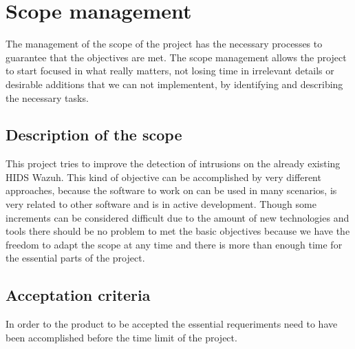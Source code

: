 \section{Scope management}
The management of the scope of the project has the necessary processes to guarantee that the objectives are met.
The scope management allows the project to start focused in what really matters, not losing time in irrelevant details or desirable additions that we can not implementent, by identifying and describing the necessary tasks.

\subsection{Description of the scope}
This project tries to improve the detection of intrusions on the already existing HIDS Wazuh. This kind of objective can be accomplished by very different approaches, because the software to work on can be used in many scenarios, is very related to other software and is in active development.
\linej
Though some increments can be considered difficult due to the amount of new technologies and tools there should be no problem to met the basic objectives because we have the freedom to adapt the scope at any time and there is more than enough time for the essential parts of the project.

\subsection{Acceptation criteria}
In order to the product to be accepted the essential requeriments need to have been accomplished before the time limit of the project.

